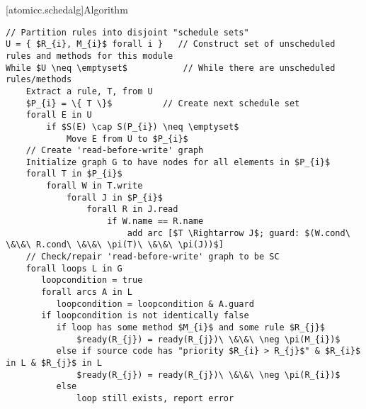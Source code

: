[atomicc.schedalg]{Algorithm}

\begin{lstlisting}[mathescape=true]
// Partition rules into disjoint "schedule sets"
U = { $R_{i}, M_{i}$ forall i }   // Construct set of unscheduled rules and methods for this module
While $U \neq \emptyset$           // While there are unscheduled rules/methods
    Extract a rule, T, from U
    $P_{i} = \{ T \}$          // Create next schedule set
    forall E in U
        if $S(E) \cap S(P_{i}) \neq \emptyset$
            Move E from U to $P_{i}$
    // Create 'read-before-write' graph
    Initialize graph G to have nodes for all elements in $P_{i}$
    forall T in $P_{i}$
        forall W in T.write
            forall J in $P_{i}$
                forall R in J.read
                    if W.name == R.name
                        add arc [$T \Rightarrow J$; guard: $(W.cond\ \&\&\ R.cond\ \&\&\ \pi(T)\ \&\&\ \pi(J))$]
    // Check/repair 'read-before-write' graph to be SC
    forall loops L in G
       loopcondition = true
       forall arcs A in L 
          loopcondition = loopcondition & A.guard
       if loopcondition is not identically false
          if loop has some method $M_{i}$ and some rule $R_{j}$
              $ready(R_{j}) = ready(R_{j})\ \&\&\ \neg \pi(M_{i})$
          else if source code has "priority $R_{i} > R_{j}$" & $R_{i}$ in L & $R_{j}$ in L
              $ready(R_{j}) = ready(R_{j})\ \&\&\ \neg \pi(R_{i})$
          else
              loop still exists, report error
\end{lstlisting}

